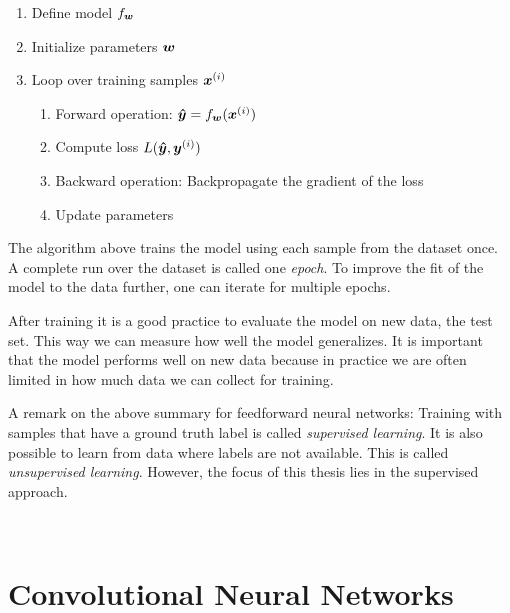 		\begin{enumerate}
			\item Define model $f_{\bm{w}}$
			\item Initialize parameters $\bm{w}$
			\item Loop over training samples $\bm{x}^{(i)}$ %
			\begin{enumerate}
				\item Forward operation: $\bm{\hat{y}} = f_{\bm{w}}(\bm{x}^{(i)})$
				\item Compute loss $L(\bm{\hat{y}}, \bm{y}^{(i)})$
				\item Backward operation: Backpropagate the gradient of the loss 
				\item Update parameters
			\end{enumerate}
		\end{enumerate}
		The algorithm above trains the model using each sample from the dataset once.
		A complete run over the dataset is called one \emph{epoch}.
		To improve the fit of the model to the data further, one can iterate for multiple epochs.
		
		After training it is a good practice to evaluate the model on new data, the test set.
		This way we can measure how well the model generalizes.
		It is important that the model performs well on new data because in practice we are often limited in how much data we can collect for training.
		
		A remark on the above summary for feedforward neural networks:
		Training with samples that have a ground truth label is called \emph{supervised learning}.
		It is also possible to learn from data where labels are not available.
		This is called \emph{unsupervised learning}.
		However, the focus of this thesis lies in the supervised approach.
		

		\\
		
	\section{Convolutional Neural Networks}
	
